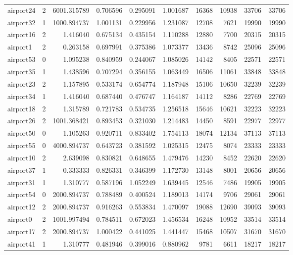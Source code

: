 \begin{longtable}{|l|r|r|r|r|r|r|r|r|r|}
airport24 & 2 & 6001.315789 & 0.706596 & 0.295091 & 1.001687 & 16368 & 10938 & 33706 & 33706 \\
airport32 & 1 & 1000.894737 & 1.001131 & 0.229956 & 1.231087 & 12708 & 7621 & 19990 & 19990 \\
airport16 & 2 & 1.416040 & 0.675134 & 0.435154 & 1.110288 & 12880 & 7700 & 20315 & 20315 \\
airport1 & 2 & 0.263158 & 0.697991 & 0.375386 & 1.073377 & 13436 & 8742 & 25096 & 25096 \\
airport53 & 0 & 1.095238 & 0.840959 & 0.244067 & 1.085026 & 14142 & 8405 & 22571 & 22571 \\
airport35 & 1 & 1.438596 & 0.707294 & 0.356155 & 1.063449 & 16506 & 11061 & 33848 & 33848 \\
airport23 & 2 & 1.157895 & 0.533174 & 0.654774 & 1.187948 & 15106 & 10650 & 32239 & 32239 \\
airport34 & 1 & 1.416040 & 0.687440 & 0.476747 & 1.164187 & 14112 & 8286 & 22769 & 22769 \\
airport18 & 2 & 1.315789 & 0.721783 & 0.534735 & 1.256518 & 15646 & 10621 & 32223 & 32223 \\
airport26 & 2 & 1001.368421 & 0.893453 & 0.321030 & 1.214483 & 14450 & 8591 & 22977 & 22977 \\
airport50 & 0 & 1.105263 & 0.920711 & 0.833402 & 1.754113 & 18074 & 12134 & 37113 & 37113 \\
airport55 & 0 & 4000.894737 & 0.643723 & 0.381592 & 1.025315 & 12475 & 8074 & 23333 & 23333 \\
airport10 & 2 & 2.639098 & 0.830821 & 0.648655 & 1.479476 & 14230 & 8452 & 22620 & 22620 \\
airport37 & 1 & 0.333333 & 0.826331 & 0.346399 & 1.172730 & 13148 & 8001 & 20656 & 20656 \\
airport31 & 1 & 1.310777 & 0.587196 & 1.052249 & 1.639445 & 12546 & 7486 & 19905 & 19905 \\
airport54 & 0 & 2000.894737 & 0.788489 & 0.400524 & 1.189013 & 14174 & 9706 & 29061 & 29061 \\
airport12 & 2 & 2000.894737 & 0.916263 & 0.553834 & 1.470097 & 19088 & 12690 & 39093 & 39093 \\
airport0 & 2 & 1001.997494 & 0.784511 & 0.672023 & 1.456534 & 16248 & 10952 & 33514 & 33514 \\
airport17 & 2 & 2000.894737 & 1.000422 & 0.441025 & 1.441447 & 15468 & 10507 & 31670 & 31670 \\
airport41 & 1 & 1.310777 & 0.481946 & 0.399016 & 0.880962 & 9781 & 6611 & 18217 & 18217 \\

\end{longtable}
